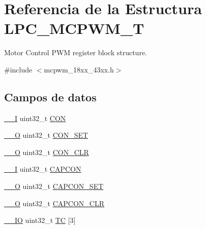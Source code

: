 \hypertarget{struct_l_p_c___m_c_p_w_m___t}{}\section{Referencia de la Estructura L\+P\+C\+\_\+\+M\+C\+P\+W\+M\+\_\+T}
\label{struct_l_p_c___m_c_p_w_m___t}


Motor Control P\+WM register block structure.  




{\ttfamily \#include $<$mcpwm\+\_\+18xx\+\_\+43xx.\+h$>$}

\subsection*{Campos de datos}
\begin{DoxyCompactItemize}
\item 
\hyperlink{core__sc300_8h_af63697ed9952cc71e1225efe205f6cd3}{\+\_\+\+\_\+I} uint32\+\_\+t \hyperlink{struct_l_p_c___m_c_p_w_m___t_a2a40f71c79507ea86bc99aaf2e876d4b}{C\+ON}
\item 
\hyperlink{core__sc300_8h_a7e25d9380f9ef903923964322e71f2f6}{\+\_\+\+\_\+O} uint32\+\_\+t \hyperlink{struct_l_p_c___m_c_p_w_m___t_a3058aa6ddb76ec0be552cc55e06c72b0}{C\+O\+N\+\_\+\+S\+ET}
\item 
\hyperlink{core__sc300_8h_a7e25d9380f9ef903923964322e71f2f6}{\+\_\+\+\_\+O} uint32\+\_\+t \hyperlink{struct_l_p_c___m_c_p_w_m___t_af2eb3afd682d54a15636b6749c65cb57}{C\+O\+N\+\_\+\+C\+LR}
\item 
\hyperlink{core__sc300_8h_af63697ed9952cc71e1225efe205f6cd3}{\+\_\+\+\_\+I} uint32\+\_\+t \hyperlink{struct_l_p_c___m_c_p_w_m___t_ae24a85711d08bacdf4d2e074b719022d}{C\+A\+P\+C\+ON}
\item 
\hyperlink{core__sc300_8h_a7e25d9380f9ef903923964322e71f2f6}{\+\_\+\+\_\+O} uint32\+\_\+t \hyperlink{struct_l_p_c___m_c_p_w_m___t_a29fe8cc389580c5ee466e528145e8772}{C\+A\+P\+C\+O\+N\+\_\+\+S\+ET}
\item 
\hyperlink{core__sc300_8h_a7e25d9380f9ef903923964322e71f2f6}{\+\_\+\+\_\+O} uint32\+\_\+t \hyperlink{struct_l_p_c___m_c_p_w_m___t_a127d7958c6b4c24b136aed46e6c6b718}{C\+A\+P\+C\+O\+N\+\_\+\+C\+LR}
\item 
\hyperlink{core__sc300_8h_aec43007d9998a0a0e01faede4133d6be}{\+\_\+\+\_\+\+IO} uint32\+\_\+t \hyperlink{struct_l_p_c___m_c_p_w_m___t_ab62d46ad00d1b422321e6d9e247ad797}{TC} \mbox{[}3\mbox{]}
\item 

\end{DoxyCompactItemize}
